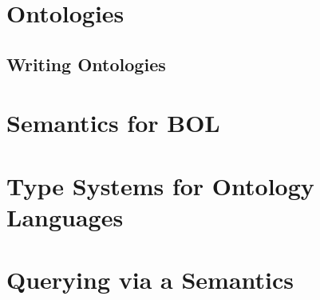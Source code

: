 \documentclass{book}
\begin{document}
\chapter{Ontologies}
 
 \section{Writing Ontologies}\label{sec:onto:write}
   

\chapter{Semantics for BOL}\label{sec:bolsem}
 

\chapter{Type Systems for Ontology Languages}\label{sec:onto:type}
   

\chapter{Querying via a Semantics}\label{sec:bolquery}
 

%
%
%
%
%
%
%



\end{document}
